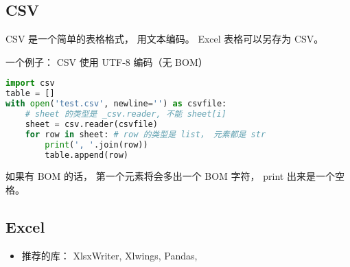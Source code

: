 
\begin{issues}
\issueDraft
\end{issues}


\subsection{CSV}
CSV 是一个简单的表格格式， 用文本编码。 Excel 表格可以另存为 CSV。

一个例子： CSV 使用 UTF-8 编码（无 BOM）
\begin{lstlisting}[language=python]
import csv
table = []
with open('test.csv', newline='') as csvfile:
    # sheet 的类型是 _csv.reader, 不能 sheet[i]
    sheet = csv.reader(csvfile)
    for row in sheet: # row 的类型是 list， 元素都是 str
        print(', '.join(row))
        table.append(row)
\end{lstlisting}
如果有 BOM 的话， 第一个元素将会多出一个 BOM 字符， print 出来是一个空格。

\subsection{Excel}
\begin{itemize}
\item 推荐的库： XlsxWriter, Xlwings, Pandas, 
\end{itemize}
